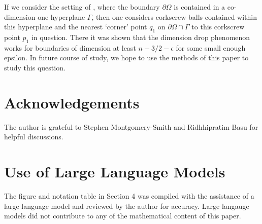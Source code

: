 \documentclass{article}
\newcounter{lem}
\theoremstyle{plain}
\theoremstyle{plain}
\newcommand{\eps}{\epsilon}
\theoremstyle{definition}
\theoremstyle{plain}
\begin{document}
    If we consider the setting of \cite{Tol24}, where the boundary $\partial\Omega$ is contained in a co-dimension one hyperplane $\Gamma$, then one considers corkscrew balls contained within this hyperplane and the nearest `corner' point $q_1$ on $\partial\Omega\cap \Gamma$ to this corkscrew point $p_1$ in question. There it was shown that the dimension drop phenomenon works for boundaries of dimension at least $n- 3/2 -\eps$ for some small enough epsilon. In future course of study, we hope to use the methods of this paper to study this question.

    
    


\section{Acknowledgements} The author is grateful to Stephen Montgomery-Smith and Ridhhipratim Basu for helpful discussions. 

\section{Use of Large Language Models} The figure and notation table in Section 4 was compiled with the assistance of a large language model and reviewed by the author for accuracy. Large langauge models did not contribute to any of the mathematical content of this paper.
\end{document}
